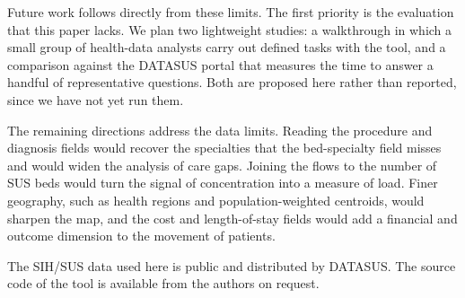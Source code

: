 Future work follows directly from these limits.
The first priority is the evaluation that this paper lacks.
We plan two lightweight studies: a walkthrough in which a small group of health-data analysts carry out defined tasks with the tool, and a comparison against the DATASUS portal that measures the time to answer a handful of representative questions.
Both are proposed here rather than reported, since we have not yet run them.

The remaining directions address the data limits.
Reading the procedure and diagnosis fields would recover the specialties that the bed-specialty field misses and would widen the analysis of care gaps.
Joining the flows to the number of SUS beds would turn the signal of concentration into a measure of load.
Finer geography, such as health regions and population-weighted centroids, would sharpen the map, and the cost and length-of-stay fields would add a financial and outcome dimension to the movement of patients.

The SIH/SUS data used here is public and distributed by DATASUS.
The source code of the tool is available from the authors on request.
